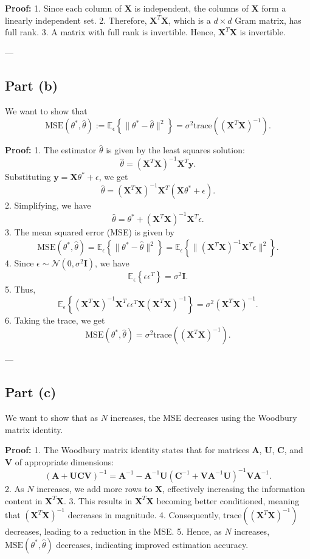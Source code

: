 \documentclass[11pt]{article}
\begin{document}
	\textbf{Proof:}
	1. Since each column of $\mathbf{X}$ is independent, the columns of $\mathbf{X}$ form a linearly independent set.
	2. Therefore, $\mathbf{X}^T \mathbf{X}$, which is a $d \times d$ Gram matrix, has full rank.
	3. A matrix with full rank is invertible. Hence, $\mathbf{X}^T \mathbf{X}$ is invertible.
	
	---
	
	\subsection*{Part (b)}
	We want to show that 
	\[
	\text{MSE}(\theta^*, \hat{\theta}) := \mathbb{E}_\epsilon \left\{ \|\theta^* - \hat{\theta}\|^2 \right\} = \sigma^2 \text{trace}((\mathbf{X}^T \mathbf{X})^{-1}).
	\]
	
	\textbf{Proof:}
	1. The estimator $\hat{\theta}$ is given by the least squares solution:
	   \[
	   \hat{\theta} = (\mathbf{X}^T \mathbf{X})^{-1} \mathbf{X}^T \mathbf{y}.
	   \]
	   Substituting $\mathbf{y} = \mathbf{X} \theta^* + \epsilon$, we get
	   \[
	   \hat{\theta} = (\mathbf{X}^T \mathbf{X})^{-1} \mathbf{X}^T (\mathbf{X} \theta^* + \epsilon).
	   \]
	2. Simplifying, we have
	   \[
	   \hat{\theta} = \theta^* + (\mathbf{X}^T \mathbf{X})^{-1} \mathbf{X}^T \epsilon.
	   \]
	3. The mean squared error (MSE) is given by
	   \[
	   \text{MSE}(\theta^*, \hat{\theta}) = \mathbb{E}_\epsilon \left\{ \|\theta^* - \hat{\theta}\|^2 \right\} = \mathbb{E}_\epsilon \left\{ \|(\mathbf{X}^T \mathbf{X})^{-1} \mathbf{X}^T \epsilon\|^2 \right\}.
	   \]
	4. Since $\epsilon \sim \mathcal{N}(0, \sigma^2 \mathbf{I})$, we have
	   \[
	   \mathbb{E}_\epsilon \left\{ \epsilon \epsilon^T \right\} = \sigma^2 \mathbf{I}.
	   \]
	5. Thus,
	   \[
	   \mathbb{E}_\epsilon \left\{ (\mathbf{X}^T \mathbf{X})^{-1} \mathbf{X}^T \epsilon \epsilon^T \mathbf{X} (\mathbf{X}^T \mathbf{X})^{-1} \right\} = \sigma^2 (\mathbf{X}^T \mathbf{X})^{-1}.
	   \]
	6. Taking the trace, we get
	   \[
	   \text{MSE}(\theta^*, \hat{\theta}) = \sigma^2 \text{trace}((\mathbf{X}^T \mathbf{X})^{-1}).
	   \]
	
	---
	
	\subsection*{Part (c)}
	We want to show that as $N$ increases, the MSE decreases using the Woodbury matrix identity.
	
	\textbf{Proof:}
	1. The Woodbury matrix identity states that for matrices $\mathbf{A}$, $\mathbf{U}$, $\mathbf{C}$, and $\mathbf{V}$ of appropriate dimensions:
	   \[
	   (\mathbf{A} + \mathbf{U} \mathbf{C} \mathbf{V})^{-1} = \mathbf{A}^{-1} - \mathbf{A}^{-1} \mathbf{U} (\mathbf{C}^{-1} + \mathbf{V} \mathbf{A}^{-1} \mathbf{U})^{-1} \mathbf{V} \mathbf{A}^{-1}.
	   \]
	2. As $N$ increases, we add more rows to $\mathbf{X}$, effectively increasing the information content in $\mathbf{X}^T \mathbf{X}$.
	3. This results in $\mathbf{X}^T \mathbf{X}$ becoming better conditioned, meaning that $(\mathbf{X}^T \mathbf{X})^{-1}$ decreases in magnitude.
	4. Consequently, $\text{trace}((\mathbf{X}^T \mathbf{X})^{-1})$ decreases, leading to a reduction in the MSE.
	5. Hence, as $N$ increases, $\text{MSE}(\theta^*, \hat{\theta})$ decreases, indicating improved estimation accuracy.
\end{document}
